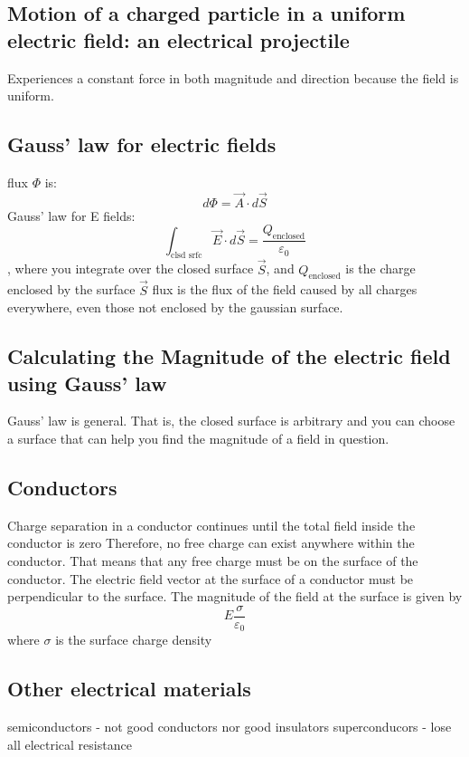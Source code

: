 \documentclass[twocolumn]{article}
\begin{document}
\subsection{Motion of a charged particle in a uniform electric field: an electrical projectile}
\begin{outline}
	\1 Experiences a constant force in both magnitude and direction because the field is uniform.
\end{outline}
\subsection{Gauss' law for electric fields}
\begin{outline}
	\1 flux $\Phi$ is: \[d\Phi=\vec{A}\cdot d\vec{S}\]
	\1 Gauss' law for E fields: \[\int_{\text{clsd srfc}}\vec{E}\cdot d\vec{S}=\dfrac{Q_{\text{enclosed}}}{\varepsilon_0}\], where you integrate over the closed surface $\vec{S}$, and $Q_{\text{enclosed}}$ is the charge enclosed by the surface $\vec{S}$
	\1 flux is the flux of the field caused by all charges everywhere, even those not enclosed by the gaussian surface. 
\end{outline}
\subsection{Calculating the Magnitude of the electric field using Gauss' law}
\begin{outline}
	\1 Gauss' law is general. That is, the closed surface is arbitrary and you can choose a surface that can help you find the magnitude of a field in question. 
\end{outline}
\subsection{Conductors}
\begin{outline}
	\1 Charge separation in a conductor continues until the total field inside the conductor is zero
	\1 Therefore, no free charge can exist anywhere within the conductor.
	\1 That means that any free charge must be on the surface of the conductor. 
	\1 The electric field vector at the surface of a conductor must be perpendicular to the surface. 
	\1 The magnitude of the field at the surface is given by \[E\dfrac{\sigma}{\varepsilon_0}\] where $\sigma$ is the surface charge density
\end{outline}
\subsection{Other electrical materials}
\begin{outline}
	\1 semiconductors - not good conductors nor good insulators 
	\1 superconducors - lose all electrical resistance
\end{outline}
\end{document}
